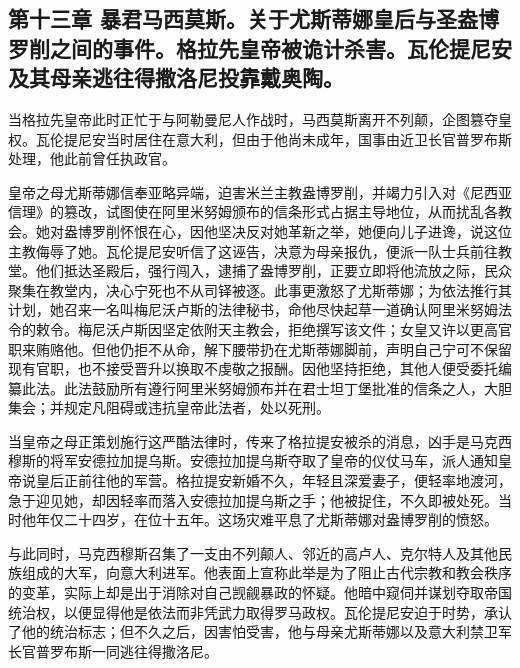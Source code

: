 
\subsection{第十三章 暴君马西莫斯。关于尤斯蒂娜皇后与圣盎博罗削之间的事件。格拉先皇帝被诡计杀害。瓦伦提尼安及其母亲逃往得撒洛尼投靠戴奥陶。}

当格拉先皇帝此时正忙于与阿勒曼尼人作战时，马西莫斯离开不列颠，企图篡夺皇权。瓦伦提尼安当时居住在意大利，但由于他尚未成年，国事由近卫长官普罗布斯处理，他此前曾任执政官。\par

皇帝之母尤斯蒂娜信奉亚略异端，迫害米兰主教盎博罗削，并竭力引入对《尼西亚信理》的篡改，试图使在阿里米努姆颁布的信条形式占据主导地位，从而扰乱各教会。她对盎博罗削怀恨在心，因他坚决反对她革新之举，她便向儿子进谗，说这位主教侮辱了她。瓦伦提尼安听信了这诬告，决意为母亲报仇，便派一队士兵前往教堂。他们抵达圣殿后，强行闯入，逮捕了盎博罗削，正要立即将他流放之际，民众聚集在教堂内，决心宁死也不从司铎被逐。此事更激怒了尤斯蒂娜；为依法推行其计划，她召来一名叫梅尼沃卢斯的法律秘书，命他尽快起草一道确认阿里米努姆法令的敕令。梅尼沃卢斯因坚定依附天主教会，拒绝撰写该文件；女皇又许以更高官职来贿赂他。但他仍拒不从命，解下腰带扔在尤斯蒂娜脚前，声明自己宁可不保留现有官职，也不接受晋升以换取不虔敬之报酬。因他坚持拒绝，其他人便受委托编纂此法。此法鼓励所有遵行阿里米努姆颁布并在君士坦丁堡批准的信条之人，大胆集会；并规定凡阻碍或违抗皇帝此法者，处以死刑。\par

当皇帝之母正策划施行这严酷法律时，传来了格拉提安被杀的消息，凶手是马克西穆斯的将军安德拉加提乌斯。安德拉加提乌斯夺取了皇帝的仪仗马车，派人通知皇帝说皇后正前往他的军营。格拉提安新婚不久，年轻且深爱妻子，便轻率地渡河，急于迎见她，却因轻率而落入安德拉加提乌斯之手；他被捉住，不久即被处死。当时他年仅二十四岁，在位十五年。这场灾难平息了尤斯蒂娜对盎博罗削的愤怒。\par

与此同时，马克西穆斯召集了一支由不列颠人、邻近的高卢人、克尔特人及其他民族组成的大军，向意大利进军。他表面上宣称此举是为了阻止古代宗教和教会秩序的变革，实际上却是出于消除对自己觊觎暴政的怀疑。他暗中窥伺并谋划夺取帝国统治权，以便显得他是依法而非凭武力取得罗马政权。瓦伦提尼安迫于时势，承认了他的统治标志；但不久之后，因害怕受害，他与母亲尤斯蒂娜以及意大利禁卫军长官普罗布斯一同逃往得撒洛尼。\par


